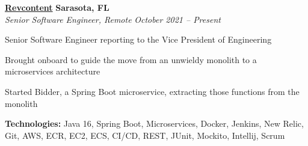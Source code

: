 %
    \headerrow
        {\textbf{\href{https://www.revcontent.com/}{Revcontent}}}
        {\textbf{Sarasota, FL}}
    \\
    \headerrow
        {\emph{Senior Software Engineer, Remote}}
        {\emph{October 2021 -- Present}}
    \begin{itemize*}
        \item Senior Software Engineer reporting to the Vice President of Engineering
        \item Brought onboard to guide the move from an unwieldy monolith to a microservices architecture
        \item Started Bidder, a Spring Boot microservice, extracting those functions from the monolith
    \end{itemize*}

    \hspace{1.0em}
        {\textbf{Technologies:} Java 16, Spring Boot, Microservices, Docker, Jenkins, New Relic,
        Git, AWS, ECR, EC2, ECS, CI/CD, REST, JUnit, Mockito, Intellij, Scrum}

